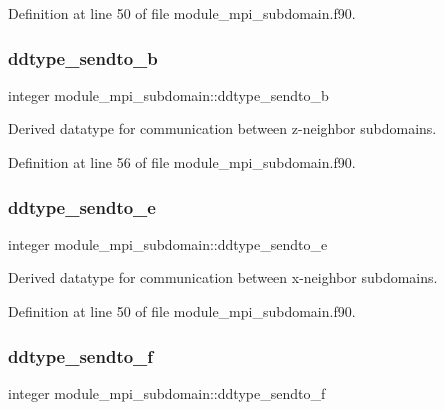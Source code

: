 Definition at line 50 of file module\+\_\+mpi\+\_\+subdomain.\+f90.

\mbox{\label{namespacemodule__mpi__subdomain_a2c99ccbd4e672593f4b2068ed3bc1c5a}} 
\subsubsection{\texorpdfstring{ddtype\_sendto\_b}{ddtype\_sendto\_b}}
{\footnotesize\ttfamily integer module\+\_\+mpi\+\_\+subdomain\+::ddtype\+\_\+sendto\+\_\+b}



Derived datatype for communication between z-\/neighbor subdomains. 



Definition at line 56 of file module\+\_\+mpi\+\_\+subdomain.\+f90.

\mbox{\label{namespacemodule__mpi__subdomain_a17fa32eaf9dfe52b13cc7f17572a63be}} 
\subsubsection{\texorpdfstring{ddtype\_sendto\_e}{ddtype\_sendto\_e}}
{\footnotesize\ttfamily integer module\+\_\+mpi\+\_\+subdomain\+::ddtype\+\_\+sendto\+\_\+e}



Derived datatype for communication between x-\/neighbor subdomains. 



Definition at line 50 of file module\+\_\+mpi\+\_\+subdomain.\+f90.

\mbox{\label{namespacemodule__mpi__subdomain_aed4d71ca15cfe63b676efed68f82e313}} 
\subsubsection{\texorpdfstring{ddtype\_sendto\_f}{ddtype\_sendto\_f}}
{\footnotesize\ttfamily integer module\+\_\+mpi\+\_\+subdomain\+::ddtype\+\_\+sendto\+\_\+f}



